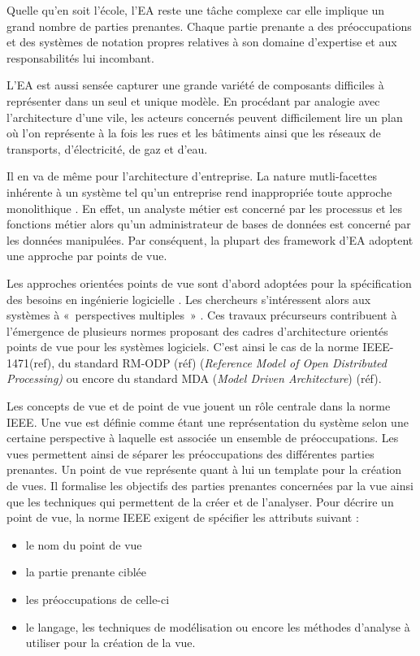 Quelle qu'en soit l'école, l'EA reste une tâche complexe \cite{steen2004supporting} car elle implique un grand nombre de parties prenantes. Chaque partie prenante a des préoccupations et des systèmes de notation propres relatives à son domaine d'expertise et aux responsabilités lui incombant.

L'EA est aussi sensée capturer une grande variété de composants difficiles à représenter dans un seul et unique modèle. 
En procédant par analogie avec l'architecture d'une vile, les acteurs concernés peuvent difficilement lire un plan où l'on représente à la fois les rues et les bâtiments ainsi que les réseaux de transports, d'électricité, de gaz et d'eau.  

Il en va de même pour l'architecture d'entreprise. La nature mutli-facettes inhérente à un système tel qu'un entreprise rend inappropriée toute approche monolithique \cite{armour1999bigpicture}. En effet, un analyste métier est concerné par les processus et les fonctions métier alors qu'un administrateur de bases de données est concerné par les données manipulées. Par conséquent, la plupart des 
framework d'EA adoptent une approche par points de vue.

Les approches orientées points de vue sont d'abord adoptées pour la 
spécification des besoins en ingénierie logicielle \cite{mullery1979core}. Les 
chercheurs s'intéressent alors aux systèmes à «~perspectives multiples~» 
\cite{finkelstein1992viewpoints} \cite{kotonya1996requirements} 
\cite{nuseibeh1994multi} \cite{meyers1993representing}. Ces travaux précurseurs contribuent à l'émergence de plusieurs normes proposant des cadres d'architecture orientés points de vue pour les systèmes logiciels. C'est ainsi le cas de la norme IEEE-1471(ref), du standard RM-ODP (réf) (\textit{Reference Model of Open Distributed Processing)} ou encore du standard MDA (\textit{Model Driven 
Architecture}) (réf).

Les concepts de vue et de point de vue jouent un rôle centrale dans la norme IEEE. Une vue est définie comme étant une représentation du système selon une certaine perspective à laquelle est associée un ensemble de préoccupations. Les vues permettent ainsi de séparer les préoccupations des différentes parties 
prenantes. Un point de vue représente quant à lui un template pour la création de 
vues. Il formalise les objectifs des parties prenantes concernées par la vue 
ainsi que les techniques qui permettent de la créer et de l'analyser. Pour 
décrire un point de vue, la norme IEEE exigent de spécifier les attributs 
suivant :
\begin{itemize}
\item le nom du point de vue
\item la partie prenante ciblée
\item les préoccupations de celle-ci
\item le langage, les techniques de modélisation ou encore les méthodes 
d'analyse à utiliser pour la création de la vue. 
\end{itemize}

